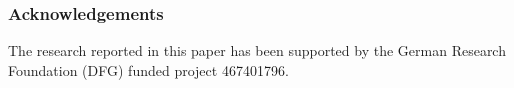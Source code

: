 














\subsubsection{Acknowledgements}

The research reported in this paper has been supported by the German Research Foundation (DFG) funded project 467401796.





